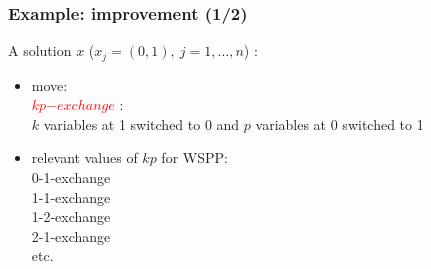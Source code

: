 \documentclass[]{beamer}
\begin{document}
\begin{frame}
  \frametitle{Example: improvement (1/2)}
\vspace{3mm}

A solution $x$ ($x_j =(0,1), \ j=1,\dots,n$) :
\medskip
 
\begin{itemize}
%	
%	
%		
  \item move: \\ 
        \textcolor{red}{$kp$$-exchange$} :\\
  	$k$ variables at 1 switched to 0 and $p$ variables at 0 switched to 1
	\medskip
	
  \item relevant values of $kp$ for WSPP: 	\\
  0-1-exchange\\
  1-1-exchange\\
  1-2-exchange\\
  2-1-exchange\\
  etc.
\end{itemize}

\end{frame}

%
%
\end{document}
